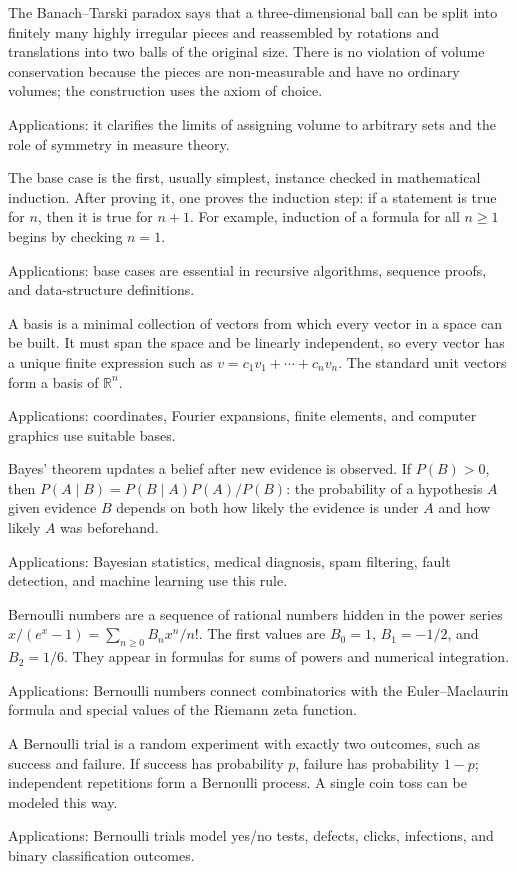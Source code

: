 The Banach--Tarski paradox says that a three-dimensional ball can be split into finitely many highly irregular pieces and reassembled by rotations and translations into two balls of the original size. There is no violation of volume conservation because the pieces are non-measurable and have no ordinary volumes; the construction uses the axiom of choice. \par\noindent Applications: it clarifies the limits of assigning volume to arbitrary sets and the role of symmetry in measure theory.

The base case is the first, usually simplest, instance checked in mathematical induction. After proving it, one proves the induction step: if a statement is true for $n$, then it is true for $n+1$. For example, induction of a formula for all $n\ge1$ begins by checking $n=1$. \par\noindent Applications: base cases are essential in recursive algorithms, sequence proofs, and data-structure definitions.

A basis is a minimal collection of vectors from which every vector in a space can be built. It must span the space and be linearly independent, so every vector has a unique finite expression such as $v=c_1v_1+\cdots+c_nv_n$. The standard unit vectors form a basis of $\mathbb R^n$. \par\noindent Applications: coordinates, Fourier expansions, finite elements, and computer graphics use suitable bases.

Bayes' theorem updates a belief after new evidence is observed. If $P(B)>0$, then $P(A\mid B)=P(B\mid A)P(A)/P(B)$: the probability of a hypothesis $A$ given evidence $B$ depends on both how likely the evidence is under $A$ and how likely $A$ was beforehand. \par\noindent Applications: Bayesian statistics, medical diagnosis, spam filtering, fault detection, and machine learning use this rule.

Bernoulli numbers are a sequence of rational numbers hidden in the power series $x/(e^x-1)=\sum_{n\ge0}B_nx^n/n!$. The first values are $B_0=1$, $B_1=-1/2$, and $B_2=1/6$. They appear in formulas for sums of powers and numerical integration. \par\noindent Applications: Bernoulli numbers connect combinatorics with the Euler--Maclaurin formula and special values of the Riemann zeta function.

A Bernoulli trial is a random experiment with exactly two outcomes, such as success and failure. If success has probability $p$, failure has probability $1-p$; independent repetitions form a Bernoulli process. A single coin toss can be modeled this way. \par\noindent Applications: Bernoulli trials model yes/no tests, defects, clicks, infections, and binary classification outcomes.

